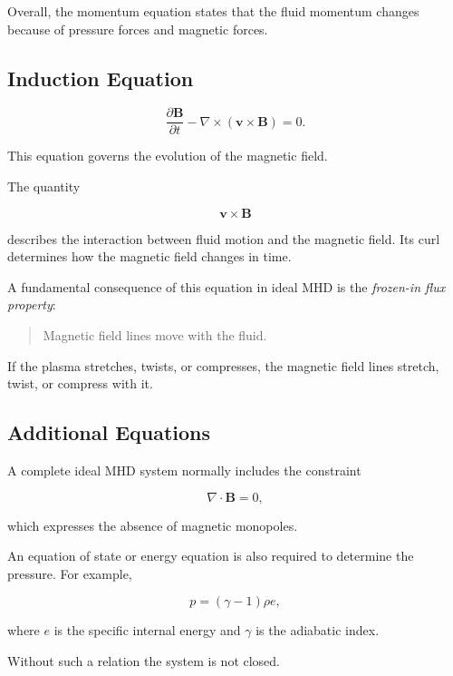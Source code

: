 \documentclass[12pt]{article}
\begin{document}
Overall, the momentum equation states that the fluid momentum changes because of
pressure forces and magnetic forces.

\subsection{Induction Equation}

\begin{equation}
\frac{\partial \mathbf{B}}{\partial t}
-
\nabla\times(\mathbf{v}\times\mathbf{B})
=
0.
\end{equation}

This equation governs the evolution of the magnetic field.

The quantity

\[
\mathbf{v}\times\mathbf{B}
\]

describes the interaction between fluid motion and the magnetic field.
Its curl determines how the magnetic field changes in time.

A fundamental consequence of this equation in ideal MHD is the
\emph{frozen-in flux property}:

\begin{quote}
Magnetic field lines move with the fluid.
\end{quote}

If the plasma stretches, twists, or compresses,
the magnetic field lines stretch, twist, or compress with it.

\subsection{Additional Equations}

A complete ideal MHD system normally includes the constraint

\begin{equation}
\nabla\cdot\mathbf{B}=0,
\end{equation}

which expresses the absence of magnetic monopoles.

An equation of state or energy equation is also required to determine the pressure.
For example,

\begin{equation}
p=(\gamma-1)\rho e,
\end{equation}

where $e$ is the specific internal energy and $\gamma$ is the adiabatic index.

Without such a relation the system is not closed.
\end{document}
